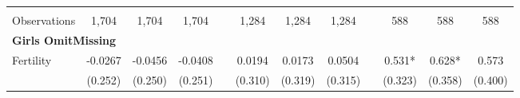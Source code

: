 \begin{landscape}
\begin{table}[htpb!]
\begin{center}
\begin{tabular}{lcccp{2mm}cccp{2mm}ccc}
\begin{footnotesize}\end{footnotesize}&\begin{footnotesize}\end{footnotesize}&\begin{footnotesize}\end{footnotesize}&\begin{footnotesize}\end{footnotesize}&\begin{footnotesize}\end{footnotesize}&\begin{footnotesize}\end{footnotesize}&\begin{footnotesize}\end{footnotesize}&\begin{footnotesize}\end{footnotesize}&\begin{footnotesize}\end{footnotesize}&\begin{footnotesize}\end{footnotesize}&\begin{footnotesize}\end{footnotesize}&\begin{footnotesize}\end{footnotesize}\\Observations&1,704&1,704&1,704&&1,284&1,284&1,284&&588&588&588\\
\multicolumn{12}{l}{\textbf{Girls OmitMissing}}\\ 
Fertility&-0.0267&-0.0456&-0.0408&&0.0194&0.0173&0.0504&&0.531*&0.628*&0.573\\
&(0.252)&(0.250)&(0.251)&&(0.310)&(0.319)&(0.315)&&(0.323)&(0.358)&(0.400)\\

\end{tabular}
\end{center}
\end{table}
\end{landscape}

